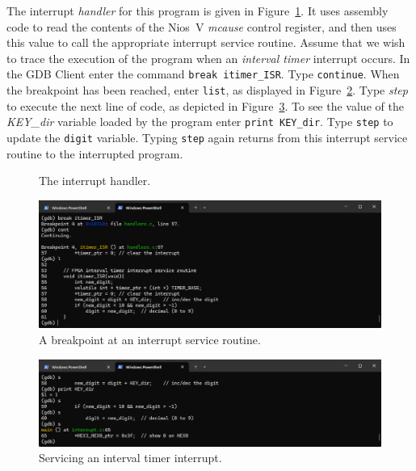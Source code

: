\documentclass[11pt, twoside, pdftex]{article}
\begin{document}
The interrupt {\it handler} for this program is given in Figure~\ref{fig:interrupt_code}.
It uses assembly code to read the contents of the Nios~V {\it mcause} control register, and then
uses this value to call the appropriate interrupt service routine. Assume that we wish to
trace the execution of the program when an {\it interval timer} interrupt occurs. In the
GDB Client enter the command \texttt{break itimer\_ISR}. Type \texttt{continue}. When the
breakpoint has been reached, enter \texttt{list}, as displayed in
Figure~\ref{fig:interrupt_C6}. Type {\it step} to execute the next line of code, as
depicted in Figure~\ref{fig:interrupt_C7}. To see the value of the {\it KEY\_dir} variable
loaded by the program enter \texttt{print KEY\_dir}. Type \texttt{step} to update the
\texttt{digit} variable. Typing \texttt{step} again returns from this interrupt service
routine to the interrupted program.

\begin{figure}[H]

	\caption{The interrupt handler.}
	\label{fig:interrupt_code}
\end{figure}

\begin{figure}[h]
    \begin{center}
        \includegraphics[scale=.6]{figures/interrupt_C6.png}
        \caption{A breakpoint at an interrupt service routine.}
        \label{fig:interrupt_C6}
    \end{center}
\end{figure}

\begin{figure}[h]
    \begin{center}
        \includegraphics[scale=.6]{figures/interrupt_C7.png}
        \caption{Servicing an interval timer interrupt.}
        \label{fig:interrupt_C7}
    \end{center}
\end{figure}
\end{document}

